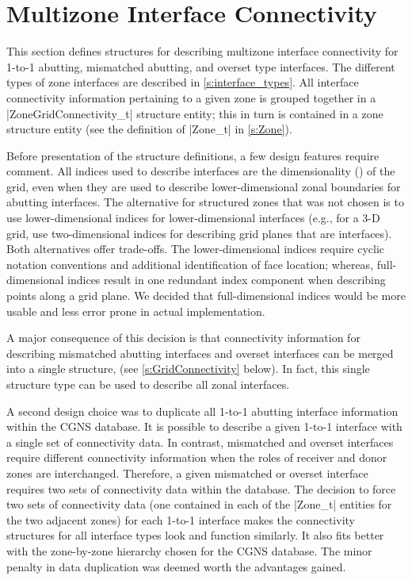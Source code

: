 \section{Multizone Interface Connectivity}
\label{s:connectivity}
\thispagestyle{plain}

This section defines structures for describing multizone interface
connectivity for 1-to-1 abutting, mismatched abutting, and overset
type interfaces.  The different types of zone interfaces are
described in \autoref{s:interface_types}.  All interface connectivity
information pertaining to a given zone is grouped together in a
|ZoneGridConnectivity_t| structure entity; this in turn is contained
in a zone structure entity (see the definition of |Zone_t| in
\autoref{s:Zone}).

Before presentation of the structure definitions, a few design features
require comment.
All indices used to describe interfaces are the dimensionality
() of the grid, even when they are used to describe
lower-dimensional zonal boundaries for abutting interfaces.
The alternative for structured zones that was not chosen is to use
lower-dimensional indices for lower-dimensional interfaces (e.g., for a
3-D grid, use two-dimensional indices for describing grid planes that
are interfaces).
Both alternatives offer trade-offs.
The lower-dimensional indices require cyclic notation conventions and
additional identification of face location; whereas, full-dimensional
indices result in one redundant index component when describing points
along a grid plane.
We decided that full-dimensional indices would be more usable and less
error prone in actual implementation.

A major consequence of this decision is that connectivity information
for describing mismatched abutting interfaces and overset interfaces
can be merged into a single structure,  (see
\autoref{s:GridConnectivity} below).
In fact, this single structure type can be used to describe all zonal
interfaces.

A second design choice was to duplicate all 1-to-1 abutting interface
information within the CGNS database.  It is possible to describe
a given 1-to-1 interface with a single set of connectivity data.
In contrast, mismatched and overset interfaces require different
connectivity information when the roles of receiver and donor zones
are interchanged.  Therefore, a given mismatched or overset interface
requires two sets of connectivity data within the database.  The
decision to force two sets of connectivity data (one contained in each
of the |Zone_t| entities for the two adjacent zones) for each 1-to-1
interface makes the connectivity structures for all interface types
look and function similarly.  It also fits better with the zone-by-zone
hierarchy chosen for the CGNS database.  The minor penalty in data
duplication was deemed worth the advantages gained.

